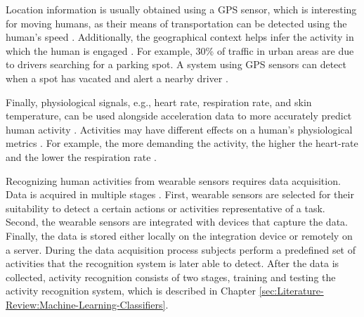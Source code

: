 \par Location information is usually obtained using a GPS sensor, which is interesting for moving humans, as their means of transportation can be detected using the human's speed \cite{Zheng2008}. Additionally, the geographical context helps infer the activity in which the human is engaged \cite{liao2006location}. For example, 30\% of traffic in urban areas are due to drivers searching for a parking spot. A system using GPS sensors can detect when a spot has vacated and alert a nearby driver \cite{Nawaz:2013}.
\par Finally, physiological signals, e.g., heart rate, respiration rate, and skin temperature, can be used alongside acceleration data to more accurately predict human activity \cite{Lara2012}. Activities may have different effects on a human's physiological metrics \cite{Lara2013}. For example, the more demanding the activity, the higher the heart-rate and the lower the respiration rate \cite{Lara2013}.
\par Recognizing human activities from wearable sensors requires data acquisition. Data is acquired in multiple stages \cite{Lara2013}. First, wearable sensors are selected for their suitability to detect a certain actions or activities representative of a task. Second, the wearable sensors are integrated with devices that capture the data. Finally, the data is stored either locally on the integration device or remotely on a server. During the data acquisition process subjects perform a predefined set of activities that the recognition system is later able to detect. After the data is collected, activity recognition consists of two stages, training and testing the activity recognition system, which is described in Chapter \ref{sec:Literature-Review:Machine-Learning-Classifiers}.

